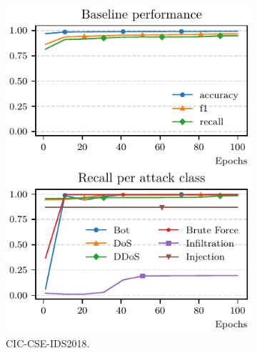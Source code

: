 \begin{figure}
  \centering
  \begin{subfigure}{.45\linewidth}
    \centering
    \includegraphics[width=\linewidth]{figures/cicids/baseline}
    \caption{
      CIC-CSE-IDS2018.
      \label{fig:assess.baseline.cicids}
    }
  \end{subfigure}
  \hfill
  \begin{subfigure}{.45\linewidth}
    \centering

\end{subfigure}
\end{figure}
